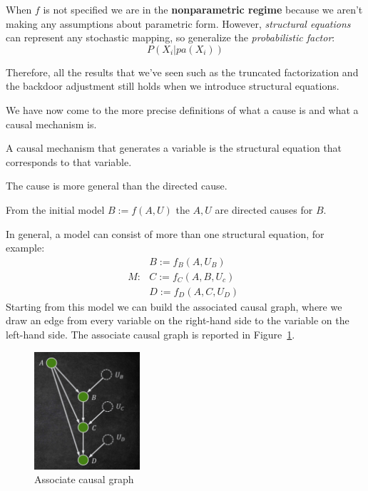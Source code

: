 When $f$ is not specified we are in the \textbf{nonparametric regime} because we
aren't making any assumptions about parametric form. However, \textit{structural
    equations} can represent any stochastic mapping, so generalize the
\textit{probabilistic factor}:
\begin{equation*}
    P(X_i | pa(X_i))
\end{equation*}

Therefore, all the results that we've seen such as the truncated factorization
and the backdoor adjustment still holds when we introduce structural equations.

We have now come to the more precise definitions of what a cause is and what a
causal mechanism is.

\begin{definition}
    A causal mechanism that generates a variable is the structural equation
    that corresponds to that variable.
\end{definition}
\begin{note}
    The cause is more general than the directed cause.
\end{note}
From the initial model $B := f(A, U)$ the $A, U$ are directed causes for $B$.

In general, a model can consist of more than one structural equation, for example:
\begin{equation}
    M : \,\, \begin{array}{l}
        B := f_B(A, U_B) \\ C := f_C(A, B, U_c) \\ D := f_D(A, C, U_D)
    \end{array}
\end{equation}
Starting from this model we can build the associated causal graph, where we draw
an edge from every variable on the right-hand side to the variable on the left-hand side.
The associate causal graph is reported in Figure~\ref{fig:associate_graph}.
\begin{figure}[!ht]
    \centering
    \includegraphics[width=0.35\textwidth]{img/structural_causal_model/graph_associate_structural_equation.png}
    \caption{Associate causal graph}
    \label{fig:associate_graph}
\end{figure}

